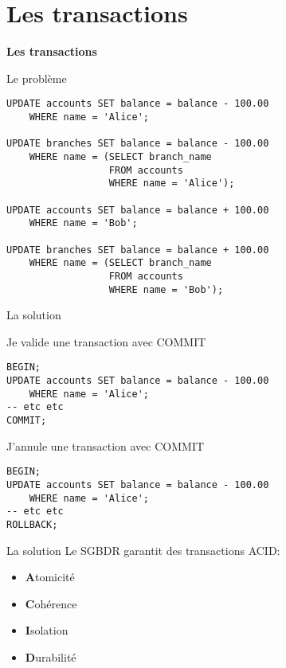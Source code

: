 \documentclass[xetex,dvipsnames]{beamer}
\begin{document}
 


\section{Les transactions}
\begin{frame}
\begin{center}
{\LARGE \textbf{Les transactions}}
\end{center}
\end{frame}

\begin{frame}[fragile]{Le problème}
	\begin{verbatim}
UPDATE accounts SET balance = balance - 100.00
    WHERE name = 'Alice';
    
UPDATE branches SET balance = balance - 100.00
    WHERE name = (SELECT branch_name 
                  FROM accounts 
                  WHERE name = 'Alice');
                 
UPDATE accounts SET balance = balance + 100.00
    WHERE name = 'Bob';
    
UPDATE branches SET balance = balance + 100.00
    WHERE name = (SELECT branch_name 
                  FROM accounts 
                  WHERE name = 'Bob');
    \end{verbatim}
\end{frame}

\begin{frame}[fragile]{La solution}
\begin{block}{Je valide une transaction avec COMMIT}
	\begin{verbatim}
BEGIN;
UPDATE accounts SET balance = balance - 100.00
    WHERE name = 'Alice';
-- etc etc
COMMIT; 
    \end{verbatim}
\end{block}
\begin{alertblock}{J'annule une transaction avec COMMIT}
	\begin{verbatim}
BEGIN;
UPDATE accounts SET balance = balance - 100.00
    WHERE name = 'Alice';
-- etc etc
ROLLBACK; 
    \end{verbatim}    
\end{alertblock}    
    
\end{frame}

\begin{frame}[fragile]{La solution}
    Le SGBDR garantit des transactions ACID:
	\begin{itemize}
		\item \textbf{A}tomicité
		\item \textbf{C}ohérence
		\item \textbf{I}solation
		\item \textbf{D}urabilité
	\end{itemize}
    
\end{frame}
\end{document}
